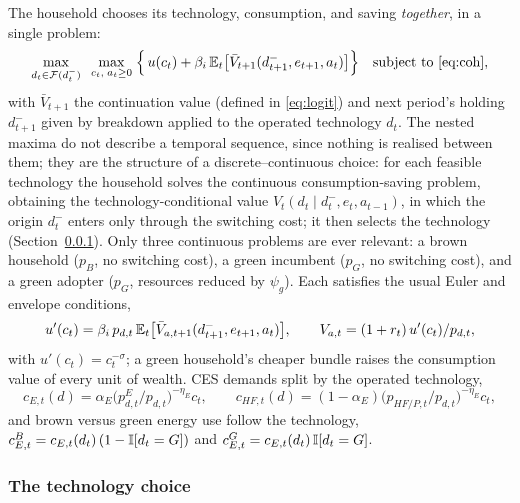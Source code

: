The household chooses its technology, consumption, and saving \emph{together}, in a
single problem:
%
\begin{equation}
\max_{d_t\in\mathcal F(d^-_t)}\;\;\max_{c_t,\;a_t\ge0}\;
\Bigl\{\,u(c_t)+\beta_i\,\mathbb{E}_t\bigl[\bar V_{t+1}(d^-_{t+1},e_{t+1},a_t)\bigr]\Bigr\}
\quad\text{subject to \eqref{eq:coh}},
\label{eq:joint}
\end{equation}
%
with $\bar V_{t+1}$ the continuation value (defined in \eqref{eq:logit}) and next
period's holding $d^-_{t+1}$ given by breakdown applied to the operated technology $d_t$. The nested
maxima do not describe a temporal sequence, since nothing is realised between
them; they are the structure of a discrete--continuous choice: for each feasible technology the
household solves the continuous consumption-saving problem, obtaining the
technology-conditional value $V_t(d_t\mid d^-_t,e_t, a_{t-1})$, in which the origin $d^-_t$ enters
only through the switching cost; it then selects the technology
(Section~\ref{sec:adoption}). Only three
continuous problems are ever relevant: a brown household ($p_B$, no switching
cost), a green incumbent ($p_G$, no switching cost), and a green adopter ($p_G$,
resources reduced by $\psi_g$). Each satisfies the usual Euler and envelope
conditions,
%
\begin{equation}
u'(c_t)=\beta_i\,p_{d,t}\,\mathbb{E}_t\bigl[\bar V_{a,t+1}(d^-_{t+1},e_{t+1},a_t)\bigr],
\qquad
V_{a,t}=(1+r_t)\,u'(c_t)/p_{d,t},
\label{eq:euler}
\end{equation}
%
with $u'(c_t)=c_t^{-\sigma}$; a green household's cheaper bundle raises the
consumption value of every unit of wealth. CES demands split by the operated
technology,
%
\begin{equation}
c_{E,t}(d)=\alpha_E\bigl(p^E_{d,t}/p_{d,t}\bigr)^{-\eta_E}c_t,
\qquad
c_{HF,t}(d)=(1-\alpha_E)\bigl(p_{HF/P,t}/p_{d,t}\bigr)^{-\eta_E}c_t,
\label{eq:hh-demands}
\end{equation}
%
and brown versus green energy use follow the technology,
$c^B_{E,t}=c_{E,t}(d_t)\,(1-\mathbb{I}[d_t=G])$ and $c^G_{E,t}=c_{E,t}(d_t)\,\mathbb{I}[d_t=G]$.

\subsubsection{The technology choice}\label{sec:adoption}

